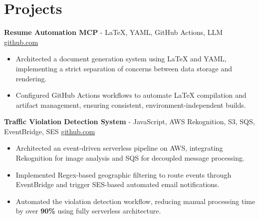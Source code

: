 \documentclass[11pt]{article}
\begin{document}

\vspace{-18.5pt}

\section*{Projects}

\textbf{Resume Automation MCP}{ - LaTeX, YAML, GitHub Actions, LLM} \hfill \href{https://github.com/Monica20030707/Tex_OrangeLeaf-mcp}{github.com}
\vspace{-9pt}
\begin{itemize}
  \item Architected a document generation system using LaTeX and YAML, implementing a strict separation of concerns between data storage and rendering.
  \item Configured GitHub Actions workflows to automate LaTeX compilation and artifact management, ensuring consistent, environment-independent builds.
\end{itemize}

\textbf{Traffic Violation Detection System}{ - JavaScript, AWS Rekognition, S3, SQS, EventBridge, SES} \hfill \href{https://github.com/Monica20030707/AWS_rekonigition-N-read-database}{github.com}
\vspace{-9pt}
\begin{itemize}
  \item Architected an event-driven serverless pipeline on AWS, integrating Rekognition for image analysis and SQS for decoupled message processing.
  \item Implemented Regex-based geographic filtering to route events through EventBridge and trigger SES-based automated email notifications.
  \item Automated the violation detection workflow, reducing manual processing time by over \textbf{90\%} using fully serverless architecture.
\end{itemize}
\end{document}
